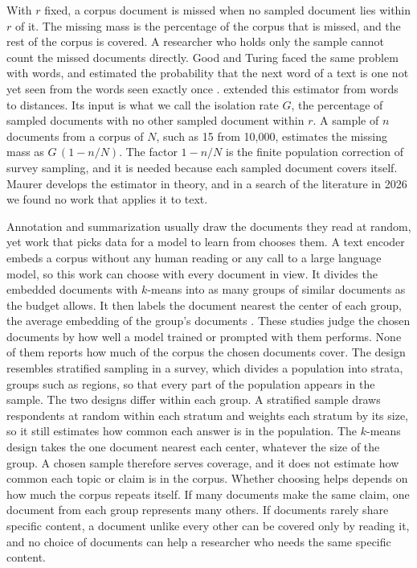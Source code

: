 With $r$ fixed, a corpus document is missed when no sampled document lies within $r$ of it. The missing mass is the percentage of the corpus that is missed, and the rest of the corpus is covered. A researcher who holds only the sample cannot count the missed documents directly. Good and Turing faced the same problem with words, and estimated the probability that the next word of a text is one not yet seen from the words seen exactly once \citep{good1953}. \citet{maurer2022missing} extended this estimator from words to distances. Its input is what we call the isolation rate $G$, the percentage of sampled documents with no other sampled document within $r$. A sample of $n$ documents from a corpus of $N$, such as 15 from 10{,}000, estimates the missing mass as $G\,(1 - n/N)$. The factor $1 - n/N$ is the finite population correction of survey sampling, and it is needed because each sampled document covers itself. Maurer develops the estimator in theory, and in a search of the literature in 2026 we found no work that applies it to text.

Annotation and summarization usually draw the documents they read at random, yet work that picks data for a model to learn from chooses them. A text encoder embeds a corpus without any human reading or any call to a large language model, so this work can choose with every document in view. It divides the embedded documents with $k$-means \citep{lloyd1982} into as many groups of similar documents as the budget allows. It then labels the document nearest the center of each group, the average embedding of the group's documents \citep{chang2021training,yuan2020coldstart,hacohen2022active,zhang2023autocot}. These studies judge the chosen documents by how well a model trained or prompted with them performs. None of them reports how much of the corpus the chosen documents cover. The design resembles stratified sampling in a survey, which divides a population into strata, groups such as regions, so that every part of the population appears in the sample. The two designs differ within each group. A stratified sample draws respondents at random within each stratum and weights each stratum by its size, so it still estimates how common each answer is in the population. The $k$-means design takes the one document nearest each center, whatever the size of the group. A chosen sample therefore serves coverage, and it does not estimate how common each topic or claim is in the corpus. Whether choosing helps depends on how much the corpus repeats itself. If many documents make the same claim, one document from each group represents many others. If documents rarely share specific content, a document unlike every other can be covered only by reading it, and no choice of documents can help a researcher who needs the same specific content.

